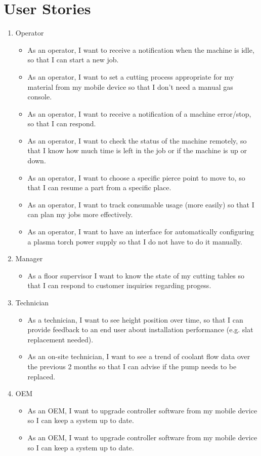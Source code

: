 \documentclass[12pt,letterpaper,titlepage]{article}
\newlength{\wideitemsep}
\let\olditem\item
\renewcommand{\item}{\setlength{\itemsep}{\wideitemsep}\olditem}
\begin{document}
\section{User Stories} \label{list:UserStories}
\begin{enumerate}
\item Operator
\begin{itemize}
\item As an operator, I want to receive a notification when the machine is idle, so that I can start a new job.
\item As an operator, I want to set a cutting process appropriate for my material from my mobile device so that I don't need a manual gas console.
\item As an operator, I want to receive a notification of a machine error/stop, so that I can respond.
\item As an operator, I want to check the status of the machine remotely, so that I know how much time is left in the job or if the machine is up or down.
\item As an operator, I want to choose a specific pierce point to move to, so that I can resume a part from a specific place.
\item As an operator, I want to track consumable usage (more easily) so that I can plan my jobs more effectively.
\item As an operator, I want to have an interface for automatically configuring a plasma torch power supply so that I do not have to do it manually.
\end{itemize}
\item Manager
\begin{itemize}
\item As a floor supervisor I want to know the state of my cutting tables so that I can respond to customer inquiries regarding progess.
\end{itemize}
\item Technician
\begin{itemize}
\item As a technician, I want to see height position over time, so that I can provide feedback to an end user about installation performance (e.g. slat replacement needed).
\item As an on-site technician, I want to see a trend of coolant flow data over the previous 2 months so that I can advise if the pump needs to be replaced.
\end{itemize}
\item OEM
\begin{itemize}
\item As an OEM, I want to upgrade controller software from my mobile device so I can keep a system up to date.
\item As an OEM, I want to upgrade controller software from my mobile device so I can keep a system up to date.
\end{itemize}
\end{enumerate}
\end{document}
